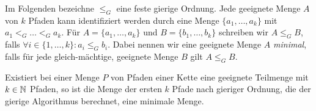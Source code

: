 Im Folgenden bezeichne $\leq_G$ eine feste gierige Ordnung.
Jede geeignete Menge $A$ von $k$ Pfaden kann identifiziert werden durch eine Menge $\{a_1, \dots, a_k\}$ mit
$a_1 <_G \dots <_G a_k$.
Für $A=\{a_1,\dots,a_k\}$ und $B=\{b_1,\dots,b_k\}$ schreiben wir $A \leq_G B$, falls $\forall i \in \{1,\dots,k\}\colon a_i \leq_G b_i$.
Dabei nennen wir eine geeignete Menge $A$ {\em minimal}, falls für jede gleich-mächtige, geeignete Menge $B$
gilt $A \leq_G B$.
\begin{lemma}\label{lem:optimalityGreedyAlgorithm}
    Existiert bei einer Menge $P$ von Pfaden einer Kette eine geeignete Teilmenge mit $k \in \mathbb N$ Pfaden, so ist die
    Menge der ersten $k$ Pfade nach gieriger Ordnung, die der gierige Algorithmus berechnet, eine minimale Menge.
\end{lemma}
